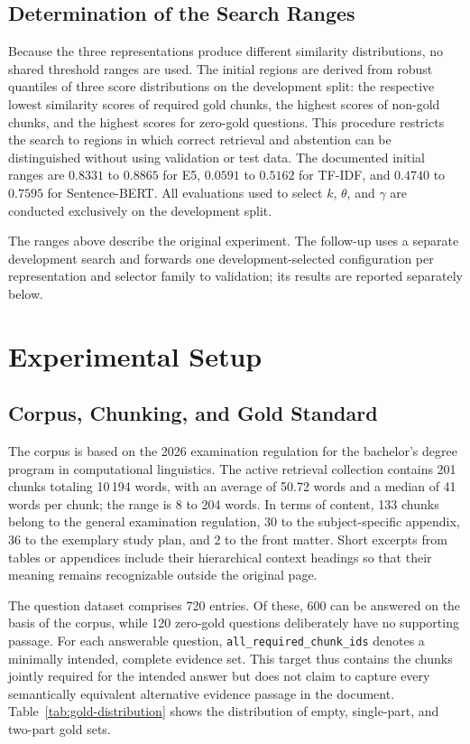 \documentclass[11pt]{article}
\newcommand{\revision}[1]{{\color{blue}#1}}
\begin{document}
\subsection{Determination of the Search Ranges}

Because the three representations produce different similarity distributions, no shared threshold ranges are used. The initial regions are derived from robust quantiles of three score distributions on the development split: the respective lowest similarity scores of required gold chunks, the highest scores of non-gold chunks, and the highest scores for zero-gold questions. This procedure restricts the search to regions in which correct retrieval and abstention can be distinguished without using validation or test data. The documented initial ranges are $0.8331$ to $0.8865$ for E5, $0.0591$ to $0.5162$ for TF-IDF, and $0.4740$ to $0.7595$ for Sentence-BERT. All evaluations used to select $k$, $\theta$, and $\gamma$ are conducted exclusively on the development split.

\revision{The ranges above describe the original experiment. The follow-up uses a separate development search and forwards one development-selected configuration per representation and selector family to validation; its results are reported separately below.}


\section{Experimental Setup}

\subsection{Corpus, Chunking, and Gold Standard}

The corpus is based on the 2026 examination regulation for the bachelor's degree program in computational linguistics. The active retrieval collection contains 201 chunks totaling 10{\,}194 words, with an average of 50.72 words and a median of 41 words per chunk; the range is 8 to 204 words. In terms of content, 133 chunks belong to the general examination regulation, 30 to the subject-specific appendix, 36 to the exemplary study plan, and 2 to the front matter. Short excerpts from tables or appendices include their hierarchical context headings so that their meaning remains recognizable outside the original page.

The question dataset comprises 720 entries. Of these, 600 can be answered on the basis of the corpus, while 120 zero-gold questions deliberately have no supporting passage. For each answerable question, \texttt{all\_required\_chunk\_ids} denotes a minimally intended, complete evidence set. This target thus contains the chunks jointly required for the intended answer but does not claim to capture every semantically equivalent alternative evidence passage in the document. Table~\ref{tab:gold-distribution} shows the distribution of empty, single-part, and two-part gold sets.
\end{document}
